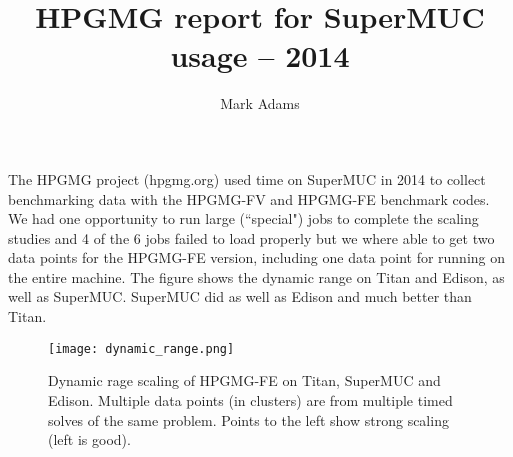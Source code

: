 \documentclass[11pt]{amsart}
\title{HPGMG report for SuperMUC usage -- 2014}
\author{Mark Adams}
\begin{document}
\maketitle

The HPGMG project (hpgmg.org) used time on SuperMUC in 2014 to collect benchmarking data with the HPGMG-FV and HPGMG-FE benchmark codes.
We had one opportunity to run large (``special") jobs to complete the scaling studies and 4 of the 6 jobs failed to load properly but we where able to get two data points for the HPGMG-FE version, including one data point for running on the entire machine.  The figure shows the dynamic range  on Titan and Edison, as well as SuperMUC.  SuperMUC did as well as Edison and much better than Titan.

\begin{figure}[htbp] %
   \centering
   \texttt{[image: dynamic\_range.png]} 
   \caption{Dynamic rage scaling of HPGMG-FE on Titan, SuperMUC and Edison.  Multiple data points (in clusters) are from multiple timed solves of the same problem.  Points to the left show strong scaling (left is good).}
   \label{fig:example}
\end{figure}
\end{document}

